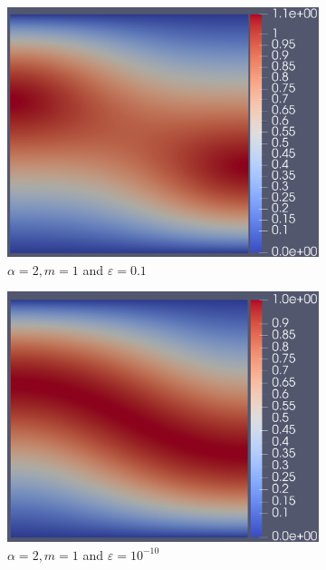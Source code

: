 \documentclass[12pt]{ociamthesis}
\begin{document}
\begin{figure}[H]
\begin{subfigure}{0.5\textwidth}
     \includegraphics[width=\textwidth]{Pics/uf/U_E1b_eps1.png}
     \caption{$\alpha=2, m=1$ and $\varepsilon = 0.1$}
 \end{subfigure}
 \begin{subfigure}{0.5\textwidth}
     \includegraphics[width=\textwidth]{Pics/uf/U_E1b_eps_10.png}
     \caption{$\alpha=2, m=1$ and $\varepsilon = 10^{-10}$}
 \end{subfigure}
 \begin{subfigure}{0.5\textwidth}

\end{subfigure}
\end{figure}
\end{document}
